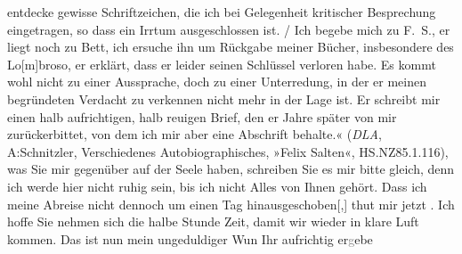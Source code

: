 \begin{ledgroupsized}[t]{13cm}
{{{                        entdecke gewisse Schriftzeichen, die ich bei Gelegenheit kritischer
                        Besprechung eingetragen, so dass ein Irrtum ausgeschlossen ist.{ / }Ich begebe mich zu F. S., er
                        liegt noch zu Bett, ich ersuche ihn um Rückgabe meiner Bücher, insbesondere
                        des Lo{[}m{]}broso, er erklärt,
                        dass er leider seinen Schlüssel verloren habe. Es kommt wohl nicht zu einer
                        Aussprache, doch zu einer Unterredung, in der er meinen begründeten Verdacht
                        zu verkennen nicht mehr in der Lage ist. Er schreibt mir einen halb
                        aufrichtigen, halb reuigen Brief, den er Jahre später von mir
                        zurückerbittet, von dem ich mir aber eine Abschrift behalte.«
                        (\emph{DLA}, A:Schnitzler, Verschiedenes
                     Autobiographisches, »Felix Salten«, HS.NZ85.1.116)}}}\label{K_L03186-1h}, was Sie mir
               gegenüber auf der Seele haben, schreiben Sie es mir bitte gleich, denn ich werde hier
               nicht ruhig sein, bis ich nicht Alles von Ihnen gehört. Dass ich meine Abreise nicht
               dennoch um einen Tag hinausgeschoben{[},{]} thut mir jetzt . Ich hoffe Sie nehmen sich die halbe Stunde
               Zeit, damit wir wieder in klare Luft kommen. Das ist nun mein ungeduldiger Wun\pend
           \pstart Ihr aufrichtig er\textcolor{gray}{g}ebe\pend{}
         
         \endnumbering{}\end{ledgroupsized}  \newcommand{\dateiname}{L03186}\newcommand{\titel}{Felix Salten an Arthur Schnitzler, 10. 8. 1892}\newcommand{\editorInnen}{Martin Anton Müller und Laura Untner}
      
